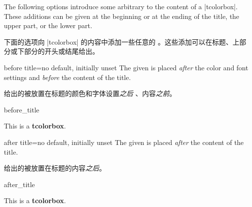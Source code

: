 The following options introduce some arbitrary  to the content
of a |tcolorbox|. These additions can be given at the beginning or at the ending
of the title, the upper part, or the lower part.

下面的选项向 |tcolorbox| 的内容中添加一些任意的 。这些添加可以在标题、上部分或下部分的开头或结尾给出。


\begin{docTcbKey}{before title}{=}{no default, initially unset}
The given  is placed \emph{after} the color and font settings
and \emph{before} the content of the title.

给出的被放置在标题的颜色和字体设置\emph{之后} 、内容\emph{之前}。
\begin{exdispExample}{before_title}

\begin{tcolorbox}[title=My title]
This is a \textbf{tcolorbox}.
\end{tcolorbox}
\end{exdispExample}
\end{docTcbKey}


\begin{docTcbKey}{after title}{=}{no default, initially unset}
The given  is placed \emph{after} the content of the title.

给出的被放置在标题的内容\emph{之后}。
\begin{exdispExample}{after_title}

\begin{tcolorbox}[title=My title]
This is a \textbf{tcolorbox}.
\end{tcolorbox}
\end{exdispExample}
\end{docTcbKey}




